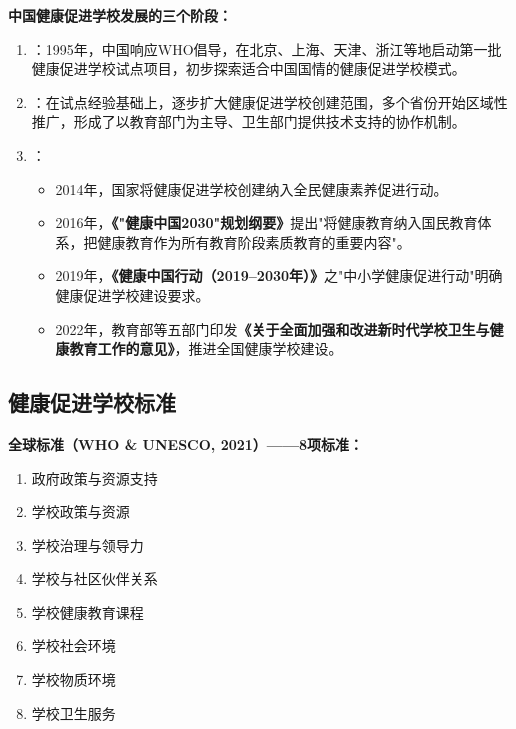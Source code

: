 \begin{keybox}
\textbf{中国健康促进学校发展的三个阶段：}

\begin{enumerate}[leftmargin=*]
    \item {}：1995年，中国响应WHO倡导，在北京、上海、天津、浙江等地启动第一批健康促进学校试点项目，初步探索适合中国国情的健康促进学校模式。

    \item {}：在试点经验基础上，逐步扩大健康促进学校创建范围，多个省份开始区域性推广，形成了以教育部门为主导、卫生部门提供技术支持的协作机制。

    \item {}：
    \begin{itemize}
        \item 2014年，国家将健康促进学校创建纳入全民健康素养促进行动。
        \item 2016年，\textbf{《"健康中国2030"规划纲要》}提出"将健康教育纳入国民教育体系，把健康教育作为所有教育阶段素质教育的重要内容"。
        \item 2019年，\textbf{《健康中国行动（2019--2030年）》}之"中小学健康促进行动"明确健康促进学校建设要求。
        \item 2022年，教育部等五部门印发\textbf{《关于全面加强和改进新时代学校卫生与健康教育工作的意见》}，推进全国健康学校建设。
    \end{itemize}
\end{enumerate}
\end{keybox}

\subsection{健康促进学校标准}

\begin{keybox}
\textbf{全球标准（WHO \& UNESCO, 2021）——8项标准：}
\begin{enumerate}[leftmargin=*]
    \item 政府政策与资源支持
    \item 学校政策与资源
    \item 学校治理与领导力
    \item 学校与社区伙伴关系
    \item 学校健康教育课程
    \item 学校社会环境
    \item 学校物质环境
    \item 学校卫生服务
\end{enumerate}
\end{keybox}

